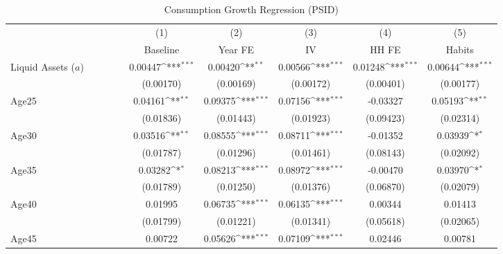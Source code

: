 {
\def\sym#1{\ifmmode^{#1}\else\(^{#1}\)\fi}
\begin{longtable}{l*{5}{c}}
\caption{Consumption Growth Regression (PSID)}\\
\toprule\endfirsthead\midrule\endhead\midrule\endfoot\endlastfoot
                    &\multicolumn{1}{c}{(1)}&\multicolumn{1}{c}{(2)}&\multicolumn{1}{c}{(3)}&\multicolumn{1}{c}{(4)}&\multicolumn{1}{c}{(5)}\\
                    &\multicolumn{1}{c}{Baseline}&\multicolumn{1}{c}{Year FE}&\multicolumn{1}{c}{IV}&\multicolumn{1}{c}{HH FE}&\multicolumn{1}{c}{Habits}\\
\midrule
Liquid Assets ($ a $) $\;\;\;\;\;\;\;\;\;\;\;\;$&     0.00447\sym{***}&     0.00420\sym{**} &     0.00566\sym{***}&     0.01248\sym{***}&     0.00644\sym{***}\\
                    &   (0.00170)         &   (0.00169)         &   (0.00172)         &   (0.00401)         &   (0.00177)         \\
\addlinespace
Age25               &     0.04161\sym{**} &     0.09375\sym{***}&     0.07156\sym{***}&    -0.03327         &     0.05193\sym{**} \\
                    &   (0.01836)         &   (0.01443)         &   (0.01923)         &   (0.09423)         &   (0.02314)         \\
\addlinespace
Age30               &     0.03516\sym{**} &     0.08555\sym{***}&     0.08711\sym{***}&    -0.01352         &     0.03939\sym{*}  \\
                    &   (0.01787)         &   (0.01296)         &   (0.01461)         &   (0.08143)         &   (0.02092)         \\
\addlinespace
Age35               &     0.03282\sym{*}  &     0.08213\sym{***}&     0.08972\sym{***}&    -0.00470         &     0.03970\sym{*}  \\
                    &   (0.01789)         &   (0.01250)         &   (0.01376)         &   (0.06870)         &   (0.02079)         \\
\addlinespace
Age40               &     0.01995         &     0.06735\sym{***}&     0.06135\sym{***}&     0.00344         &     0.01413         \\
                    &   (0.01799)         &   (0.01221)         &   (0.01341)         &   (0.05618)         &   (0.02065)         \\
\addlinespace
Age45               &     0.00722         &     0.05626\sym{***}&     0.07109\sym{***}&     0.02446         &     0.00781         \\

\end{longtable}}
